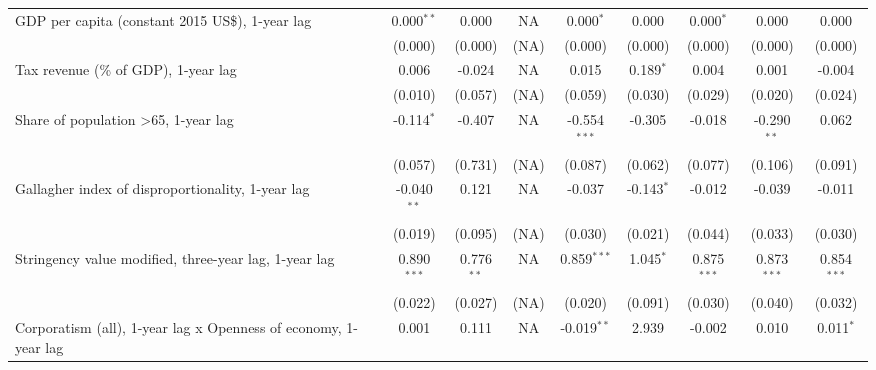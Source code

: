 \begin{table}[htbp]
\begin{tabular}{lcccccccc}
      GDP per capita (constant 2015 US\$), 1-year lag                 & 0.000$^{**}$  & 0.000                     & NA           & 0.000$^{*}$    & 0.000            & 0.000$^{*}$     & 0.000           & 0.000\\   
                                                                      & (0.000)       & (0.000)                   & (NA)         & (0.000)        & (0.000)          & (0.000)         & (0.000)         & (0.000)\\   
      Tax revenue (\% of GDP), 1-year lag                             & 0.006         & -0.024                    & NA           & 0.015          & 0.189$^{*}$      & 0.004           & 0.001           & -0.004\\   
                                                                      & (0.010)       & (0.057)                   & (NA)         & (0.059)        & (0.030)          & (0.029)         & (0.020)         & (0.024)\\   
      Share of population >65, 1-year lag                             & -0.114$^{*}$  & -0.407                    & NA           & -0.554$^{***}$ & -0.305           & -0.018          & -0.290$^{**}$   & 0.062\\   
                                                                      & (0.057)       & (0.731)                   & (NA)         & (0.087)        & (0.062)          & (0.077)         & (0.106)         & (0.091)\\   
      Gallagher index of disproportionality, 1-year lag               & -0.040$^{**}$ & 0.121                     & NA           & -0.037         & -0.143$^{*}$     & -0.012          & -0.039          & -0.011\\   
                                                                      & (0.019)       & (0.095)                   & (NA)         & (0.030)        & (0.021)          & (0.044)         & (0.033)         & (0.030)\\   
      Stringency value modified, three-year lag, 1-year lag           & 0.890$^{***}$ & 0.776$^{**}$              & NA           & 0.859$^{***}$  & 1.045$^{*}$      & 0.875$^{***}$   & 0.873$^{***}$   & 0.854$^{***}$\\   
                                                                      & (0.022)       & (0.027)                   & (NA)         & (0.020)        & (0.091)          & (0.030)         & (0.040)         & (0.032)\\   
      Corporatism (all), 1-year lag x Openness of economy, 1-year lag & 0.001         & 0.111                     & NA           & -0.019$^{**}$  & 2.939            & -0.002          & 0.010           & 0.011$^{*}$\\   

\end{tabular}
\end{table}
